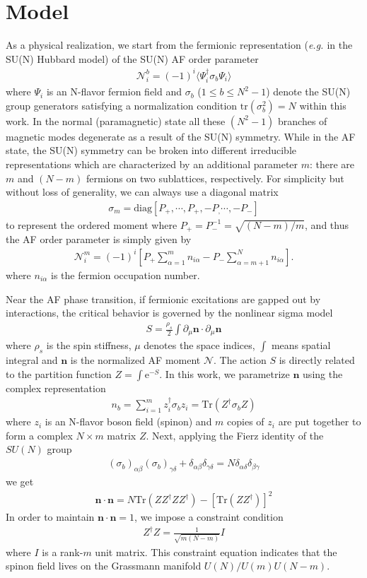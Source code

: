 \documentclass[aps,twocolumn,superscriptaddress]{revtex4-1}
\newcommand{\bea}{\begin{eqnarray}}
\newcommand{\eea}{\end{eqnarray}}
\newcommand{\bn}{\mathbf{n}}
\newcommand{\eg}{\textit{e.g.{ }}}
\newcommand{\me}{\mathrm{e}}
\begin{document}
\section{Model}
As a physical realization, we start from the fermionic representation (\eg in the SU(N) Hubbard model) of the SU(N) AF order parameter \bea
\mathcal{N}_i^b=(-1)^i\langle \Psi_i^\dagger \sigma_b \Psi_i\rangle \eea where $\Psi_i$ is an N-flavor fermion field and
$\sigma_b$ ($1\le b\le N^2-1$) denote the SU(N) group generators satisfying a normalization condition
$\mathrm{tr}(\sigma_b^2)=N$ within this work. In the normal (paramagnetic) state all these $(N^2-1)$ branches of magnetic modes
degenerate as a result of the SU(N) symmetry. While in the AF state, the SU(N) symmetry can be broken into different
irreducible representations which are characterized by an additional parameter $m$: there are $m$ and $(N-m)$ fermions on two sublattices, respectively. For simplicity but without loss of generality, we can always use a diagonal matrix \bea
\sigma_m=\text{diag}\left[P_+,\cdots,P_+,-P_,\cdots,-P_-\right] \eea to represent the ordered moment where
$P_+=P_-^{-1}=\sqrt{(N-m)/m}$, and thus the AF order parameter is simply given by \bea
\mathcal{N}_i^m=(-1)^i\left[P_+\sum_{\alpha=1}^m n_{i\alpha}-P_-\sum_{\alpha=m+1}^{N}n_{i\alpha} \right]. \eea where
$n_{i\alpha}$ is the fermion occupation number. 

Near the AF phase transition, if fermionic excitations are gapped out by interactions, the critical behavior is governed by the nonlinear sigma model \bea
\label{eq:NLsM}S=\frac{\rho_s}{2}\int \partial_\mu\bn \cdot \partial_\mu\bn \eea where $\rho_s$ is the spin stiffness,
$\mu$ denotes the space indices, $\int$ means spatial integral and $\bn$ is the normalized AF moment $\mathcal{N}$.
The action $S$ is directly related to the partition function $Z=\int \me^{-S}$. In this work, we parametrize $\bn$ using
the complex representation \bea \label{eq:cprep}n_b=\sum_{i=1}^m z_i^\dag \sigma_b z_i=\mathrm{Tr}(Z^\dag\sigma_b Z)
\eea where $z_i$ is an N-flavor boson field (spinon) and $m$ copies of $z_i$ are put together to form a complex
$N\times m$ matrix $Z$. Next, applying the Fierz identity of the $SU(N)$ group \bea \label{eq:Fierz}
(\sigma_b)_{\alpha\beta}
(\sigma_b)_{\gamma\delta}+\delta_{\alpha\beta}\delta_{\gamma\delta}=N\delta_{\alpha\delta}\delta_{\beta\gamma} \eea we
get \bea \bn\cdot\bn = N\mathrm{Tr}(ZZ^\dag Z Z^\dag)-[\mathrm{Tr}(ZZ^\dag)]^2 \eea In order to maintain $\bn\cdot\bn=1$,
we impose a constraint condition \bea Z^\dag Z=\frac{1}{\sqrt{m(N-m)}}I \label{eq:normalizeZ}\eea where $I$ is a
rank-$m$ unit matrix. This constraint equation indicates that the spinon field lives on the Grassmann manifold
$U(N)/U(m)U(N-m)$. 
\end{document}
